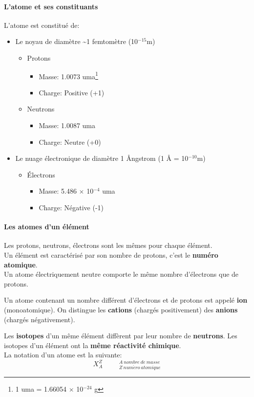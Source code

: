 \documentclass[10pt,a4paper]{book}
\begin{document}
\paragraph{L'atome et ses constituants} L'atome est constitué de:
\begin{itemize}
\item Le noyau de diamètre \textasciitilde 1 femtomètre (10$^{-15}$m)
\begin{itemize}
\item Protons
\begin{itemize}
	\item Masse: 1.0073 uma\footnote{1 uma = 1.66054 $\times$ 10$^{-24}$ g}
	\item Charge: Positive (+1) 
\end{itemize}
\item Neutrons
\begin{itemize}
	\item Masse: 1.0087 uma
	\item Charge: Neutre (+0) 
\end{itemize}
\end{itemize}
\item Le nuage électronique de diamètre 1 {\AA}ngstrom (1 {\AA} = 10$^{-10}$m)
\begin{itemize}
\item Électrons
\begin{itemize}
	\item Masse: 5.486 $\times$ 10$^{-4}$ uma
	\item Charge: Négative (-1) 
\end{itemize}
\end{itemize}
\end{itemize}
\paragraph{Les atomes d'un élément} Les protons, neutrons, électrons sont les mêmes pour chaque élément. \\ 
Un élément est caractérisé par son nombre de protons, c'est le \textbf{numéro atomique}. \\
Un atome électriquement neutre comporte le même nombre d’électrons
que de protons. \par 
Un atome contenant un nombre différent d’électrons et de protons est appelé \textbf{ion} (monoatomique). On distingue les \textbf{cations} (chargés positivement) des \textbf{anions} (chargés négativement). \par
Les \textbf{isotopes} d’un même élément diffèrent par leur nombre de
\textbf{neutrons}. Les isotopes d’un élément ont la \textbf{même réactivité chimique}.\\
La notation d'un atome est la suivante:
\textbf{\[{X_A^Z} \hspace{1cm} { }_{Z \: num\acute{e}ro \: atomique}^{A \: nombre \: de \: masse}\]} %
\end{document}
